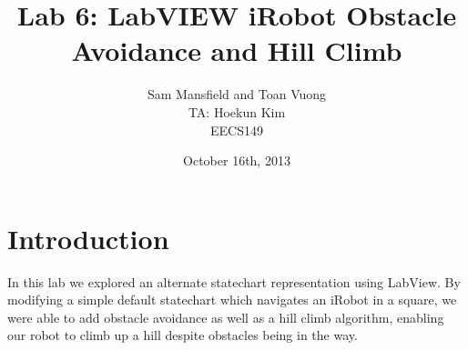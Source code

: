 \documentclass[10pt,titlepage]{article}
\begin{document}
  \title{Lab 6: LabVIEW iRobot Obstacle Avoidance and Hill Climb}
  \author{Sam Mansfield and Toan Vuong \\
          TA: Hoekun Kim \\
          EECS149}
  \date{October 16th, 2013}
  \maketitle

  \section{Introduction}
    In this lab we explored an alternate statechart representation using LabView. By modifying a simple default statechart which navigates an iRobot in a square, we were able to add obstacle avoidance as well as a hill climb algorithm, enabling our robot to climb up a hill despite obstacles being in the way.  
\end{document}
